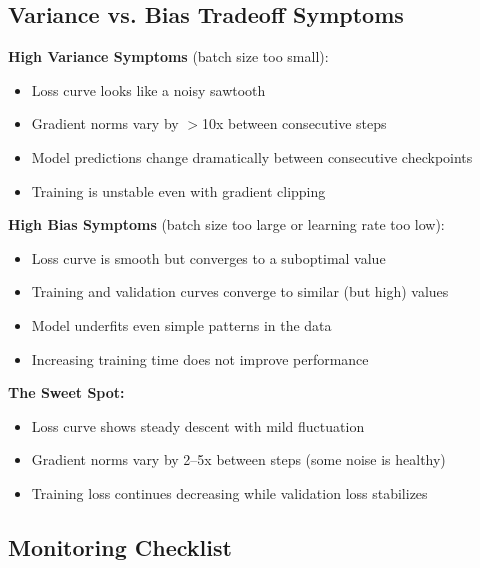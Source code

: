\documentclass[../../main.tex]{subfiles}
\begin{document}
\subsection{Variance vs. Bias Tradeoff Symptoms}

\begin{keyconcept}
\textbf{High Variance Symptoms} (batch size too small):
\begin{itemize}
    \item Loss curve looks like a noisy sawtooth
    \item Gradient norms vary by $>$10x between consecutive steps
    \item Model predictions change dramatically between consecutive checkpoints
    \item Training is unstable even with gradient clipping
\end{itemize}

\textbf{High Bias Symptoms} (batch size too large or learning rate too low):
\begin{itemize}
    \item Loss curve is smooth but converges to a suboptimal value
    \item Training and validation curves converge to similar (but high) values
    \item Model underfits even simple patterns in the data
    \item Increasing training time does not improve performance
\end{itemize}

\textbf{The Sweet Spot:}
\begin{itemize}
    \item Loss curve shows steady descent with mild fluctuation
    \item Gradient norms vary by 2--5x between steps (some noise is healthy)
    \item Training loss continues decreasing while validation loss stabilizes
\end{itemize}
\end{keyconcept}

\subsection{Monitoring Checklist}
\end{document}
